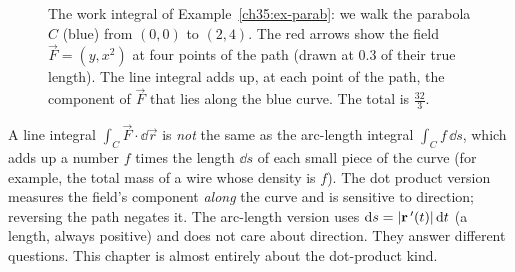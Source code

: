 \begin{figure}[htbp]
\centering
{}
\caption{The work integral of Example~\ref{ch35:ex-parab}: we walk the parabola
$C$ (blue) from $(0,0)$ to $(2,4)$. The red arrows show the field
$\vec F=(y,x^2)$ at four points of the path (drawn at $0.3$ of their true length).
The line integral adds up, at each point of the path, the component of $\vec F$
that lies along the blue curve. The total is $\tfrac{32}{3}$.}
\label{ch35:fig-work}
\end{figure}

\begin{trapbox}
A line integral $\int_C \vec F\cdot\dd\vec r$ is \emph{not} the same as the
arc-length integral $\int_C f\,\dd s$, which adds up a number $f$ times the length
$\dd s$ of each small piece of the curve (for example, the total mass of a wire whose
density is $f$). The dot product version measures the field's component \emph{along} the curve and is
sensitive to direction; reversing the path negates it. The arc-length version uses
$\mathrm{d} s = \lvert\mathbf{r}\,'(t)\rvert\,\mathrm{d} t$ (a length, always positive) and does not care
about direction. They answer different questions. This chapter is almost entirely
about the dot-product kind.
\end{trapbox}

